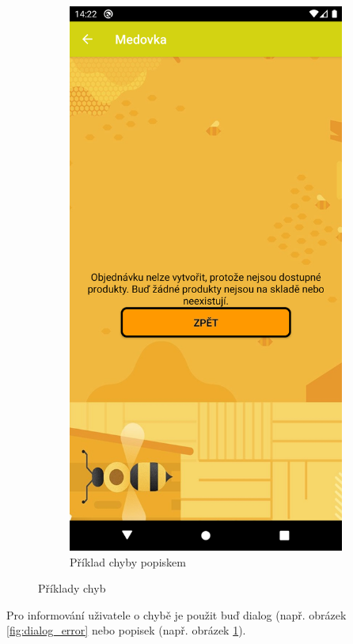 \documentclass[12pt]{report}
\begin{document}
\begin{figure}[H]
	\begin{subfigure}{.45\textwidth}
	  \centering
	  \includegraphics[width=.9\textwidth]{img/error_label.png}
	  \caption{Příklad chyby popiskem}
	  \label{fig:label_error}
	\end{subfigure}
	\caption{Příklady chyb}
	\label{fig:error_cont}
\end{figure}
%
Pro informování uživatele o chybě je použit buď dialog (např. obrázek \ref{fig:dialog_error} 
nebo popisek (např. obrázek \ref{fig:label_error}).
\end{document}
